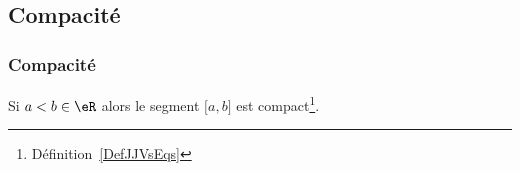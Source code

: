 \subsection{Compacité}

\subsubsection{Compacité}

\begin{lemma}\label{LemOACGWxV}
    Si \( a<b\in \eR\) alors le segment \( \mathopen[ a , b \mathclose]\) est compact\footnote{Définition~\ref{DefJJVsEqs}}.
\end{lemma}

